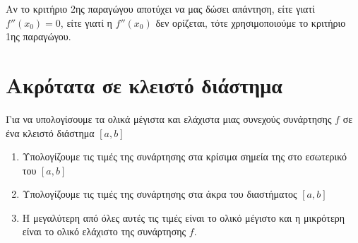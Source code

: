 \begin{rem}
  Αν το κριτήριο 2ης παραγώγου αποτύχει να μας δώσει απάντηση, είτε γιατί 
  $ f''(x_{0}) = 0 $, είτε γιατί η $ f''(x_{0}) $ δεν ορίζεται, τότε χρησιμοποιούμε 
  το κριτήριο 1ης παραγώγου.
\end{rem}

\section*{Ακρότατα σε κλειστό διάστημα}

Για να υπολογίσουμε τα ολικά μέγιστα και ελάχιστα μιας συνεχούς συνάρτησης $f$ σε ένα 
κλειστό διάστημα $ [a,b] $
\begin{enumerate}
  \item Υπολογίζουμε τις τιμές της συνάρτησης στα κρίσιμα σημεία της στο εσωτερικό του 
    $ [a,b] $
  \item Υπολογίζουμε τις τιμές της συνάρτησης στα άκρα του διαστήματος $ [a,b] $
  \item Η μεγαλύτερη από όλες αυτές τις τιμές είναι το ολικό μέγιστο και η μικρότερη 
    είναι το ολικό ελάχιστο της συνάρτησης $f$.
\end{enumerate}



